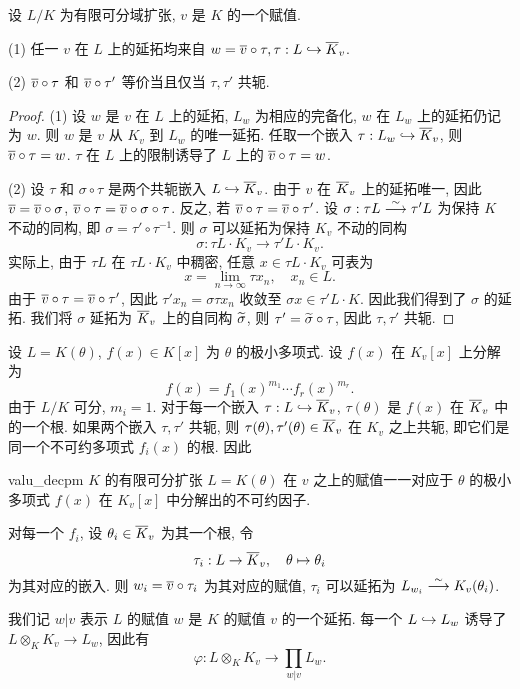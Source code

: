 \begin{proposition}{}{}
设 $L/K$ 为有限可分域扩张, $v$ 是 $K$ 的一个赋值.

(1) 任一 $v$ 在 $L$ 上的延拓均来自 $w=\overline v\circ \tau,\tau:L\hookrightarrow\overline K_v$.

(2) $\overline v\circ\tau$ 和 $\overline v\circ \tau'$ 等价当且仅当 $\tau,\tau'$ 共轭.
\end{proposition}
\begin{proof}
(1) 设 $w$ 是 $v$ 在 $L$ 上的延拓, $L_w$ 为相应的完备化, $w$ 在 $L_w$ 上的延拓仍记为 $w$. 则 $w$ 是 $v$ 从 $K_v$ 到 $L_w$ 的唯一延拓. 任取一个嵌入 $\tau:L_w\hookrightarrow \overline K_v$, 则 $\overline v\circ \tau=w$. $\tau$ 在 $L$ 上的限制诱导了 $L$ 上的 $\overline v\circ \tau=w$.

(2) 设 $\tau$ 和 $\sigma\circ\tau$ 是两个共轭嵌入 $L\hookrightarrow\overline K_v$. 由于 $v$ 在 $\overline K_v$ 上的延拓唯一, 因此 $\overline v=\overline v\circ \sigma$, $\overline v\circ \tau=\overline v\circ \sigma\circ\tau$.
反之, 若 $\overline v\circ\tau=\overline v\circ\tau'$. 设 $\sigma:\tau L\stackrel{\sim}{\longrightarrow}\tau' L$ 为保持 $K$ 不动的同构, 即 $\sigma=\tau'\circ\tau^{-1}$. 则 $\sigma$ 可以延拓为保持 $K_v$ 不动的同构
  \[\sigma:\tau L\cdot K_v\to \tau' L\cdot K_v.\]
实际上, 由于 $\tau L$ 在 $\tau L\cdot K_v$ 中稠密, 任意 $x\in\tau L\cdot K_v$ 可表为
  \[x=\lim_{n\to\infty}\tau x_n,\quad x_n\in L.\]
由于 $\overline v\circ\tau=\overline v\circ\tau'$, 因此 $\tau'x_n=\sigma\tau x_n$ 收敛至 $\sigma x\in\tau' L\cdot K$. 因此我们得到了 $\sigma$ 的延拓. 我们将 $\sigma$ 延拓为 $\overline K_v$ 上的自同构 $\widetilde \sigma$, 则 $\tau'=\widetilde \sigma\circ\tau$, 因此 $\tau,\tau'$ 共轭.
\end{proof}

设 $L=K(\theta)$, $f(x)\in K[x]$ 为 $\theta$ 的极小多项式. 设 $f(x)$ 在 $K_v[x]$ 上分解为
  \[f(x)=f_1(x)^{m_1}\cdots f_r(x)^{m_r}.\]
由于 $L/K$ 可分, $m_i=1$. 对于每一个嵌入 $\tau:L\hookrightarrow \overline K_v$, $\tau(\theta)$ 是 $f(x)$ 在 $\overline K_v$ 中的一个根. 如果两个嵌入 $\tau,\tau'$ 共轭, 则 $\tau(\theta),\tau'(\theta)\in \overline K_v$ 在 $K_v$ 之上共轭, 即它们是同一个不可约多项式 $f_i(x)$ 的根. 因此

\begin{proposition}{}{valu_decpm}
$K$ 的有限可分扩张 $L=K(\theta)$ 在 $v$ 之上的赋值一一对应于 $\theta$ 的极小多项式 $f(x)$ 在 $K_v[x]$ 中分解出的不可约因子.
\end{proposition}
对每一个 $f_i$, 设 $\theta_i\in\overline K_v$ 为其一个根, 令
  \[\tau_i:L\to \overline K_v,\quad \theta\mapsto \theta_i\]
为其对应的嵌入. 则 $w_i=\overline v\circ \tau_i$ 为其对应的赋值, $\tau_i$ 可以延拓为 $L_{w_i}\stackrel{\sim}{\longrightarrow} K_v(\theta_i)$.

我们记 $w| v$ 表示 $L$ 的赋值 $w$ 是 $K$ 的赋值 $v$ 的一个延拓. 每一个 $L\hookrightarrow L_w$ 诱导了 $L\otimes_K K_v\to L_w$, 因此有
  \[\varphi: L\otimes_K K_v\to \prod_{w|v} L_w.\]

